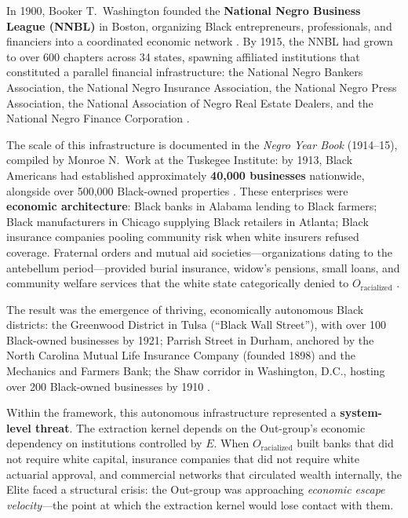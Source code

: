In 1900, Booker T.\ Washington founded the \textbf{National Negro Business League (NNBL)} in Boston, organizing Black entrepreneurs, professionals, and financiers into a coordinated economic network \cite{washington_nnbl}. By 1915, the NNBL had grown to over 600 chapters across 34 states, spawning affiliated institutions that constituted a parallel financial infrastructure: the National Negro Bankers Association, the National Negro Insurance Association, the National Negro Press Association, the National Association of Negro Real Estate Dealers, and the National Negro Finance Corporation \cite{washington_nnbl, work_yearbook}.

The scale of this infrastructure is documented in the \textit{Negro Year Book} (1914--15), compiled by Monroe N.\ Work at the Tuskegee Institute: by 1913, Black Americans had established approximately \textbf{40,000 businesses} nationwide, alongside over 500,000 Black-owned properties \cite{work_yearbook}. These enterprises were \textbf{economic architecture}: Black banks in Alabama lending to Black farmers; Black manufacturers in Chicago supplying Black retailers in Atlanta; Black insurance companies pooling community risk when white insurers refused coverage. Fraternal orders and mutual aid societies---organizations dating to the antebellum period---provided burial insurance, widow's pensions, small loans, and community welfare services that the white state categorically denied to $O_{\text{racialized}}$ \cite{walker_business}.

The result was the emergence of thriving, economically autonomous Black districts: the Greenwood District in Tulsa (``Black Wall Street''), with over 100 Black-owned businesses by 1921; Parrish Street in Durham, anchored by the North Carolina Mutual Life Insurance Company (founded 1898) and the Mechanics and Farmers Bank; the Shaw corridor in Washington, D.C., hosting over 200 Black-owned businesses by 1910 \cite{walker_business, messer_tulsa}.

Within the framework, this autonomous infrastructure represented a \textbf{system-level threat}. The extraction kernel depends on the Out-group's economic dependency on institutions controlled by $E$. When $O_{\text{racialized}}$ built banks that did not require white capital, insurance companies that did not require white actuarial approval, and commercial networks that circulated wealth internally, the Elite faced a structural crisis: the Out-group was approaching \textit{economic escape velocity}---the point at which the extraction kernel would lose contact with them.

